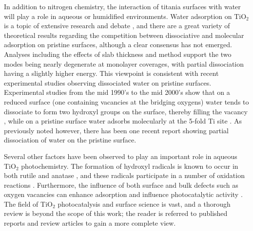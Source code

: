 \documentclass[journal=ascecg,manuscript=article,articletitle=true]{achemso}
\begin{document}
In addition to nitrogen chemistry, the interaction of titania surfaces with water will play a role in aqueous or humidified environments. Water adsorption on TiO$_2$ is a topic of extensive research and debate \cite{Sun2010,Harris2004,Kumar2013,Pang2008,Pang_2013,Benkoula2015,Lindan_1996,Bates1998,Schaub_2001,Lindan_2005}, and there are a great variety of theoretical results regarding the competition between dissociative\cite{Lindan_1996,Lindan_2005} and molecular adsorption\cite{Bates1998,Schaub_2001,Kowalski_2009} on pristine surfaces, although a clear consensus has not emerged. Analyses including the effects of slab thickness\cite{Harris2004} and method\cite{Kumar2013} support the two modes being nearly degenerate at monolayer coverages, with partial dissociation having a slightly higher energy. This viewpoint is consistent with recent experimental studies observing dissociated water on pristine surfaces.\cite{Walle2009}  
Experimental studies from the mid 1990's to the mid 2000's show that on a reduced surface (one containing vacancies at the bridging oxygens) water tends to dissociate to form two hydroxyl groups on the surface, thereby filling the vacancy \cite{Henderson1996,Schaub_2001,Krischok_2001,Ketteler_2007}, while on a pristine surface water adsorbs molecularly at the 5-fold Ti site \cite{Hugenschmidt_1994}. As previously noted however, there has been one recent report showing partial dissociation of water on the pristine surface.\cite{Walle2009}

Several other factors have been observed to play an important role in aqueous TiO$_2$ photochemistry. The formation of hydroxyl radicals is known to occur in both rutile and anatase \cite{Ishibashi_2000,Xiang_2011}, and these radicals participate in a number of oxidation reactions \cite{Ishibashi_2000}. Furthermore, the influence of both surface and bulk defects such as oxygen vacancies can enhance adsorption and influence photocatalytic activity \cite{Yan_2013}.
The field of TiO$_2$ photocatalysis and surface science is vast, and a thorough review is beyond the scope of this work; the reader is referred to published reports and review articles to gain a more complete view. \cite{Henderson_2011,Diebold2003,Benkoula2015,Pang2008,Pang_2013}
\end{document}
